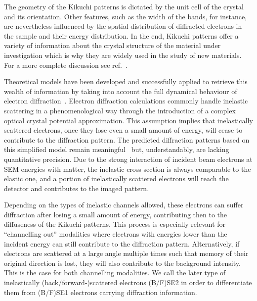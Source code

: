 The geometry of the Kikuchi patterns is dictated by the unit cell of the crystal and its orientation. Other features, such as the width of the bands, for instance, are nevertheless influenced by the spatial distribution of diffracted electrons in the sample and their energy distribution. In the end, Kikuchi patterns offer a variety of information about the crystal structure of the material under investigation which is why they are widely used in the study of new materials. For a more complete discussion see ref.~\cite{winkelmann2017}.


Theoretical models have been developed and successfully applied to retrieve this wealth of information by taking into account the full dynamical behaviour of electron diffraction~\cite{Winkelmann07, Picard14, singh2016}. Electron diffraction calculations commonly handle inelastic scattering in a phenomenological way through the introduction of a complex optical crystal potential approximation. This assumption implies that inelastically scattered electrons, once they lose even a small amount of energy, will cease to contribute to the diffraction pattern. The predicted diffraction patterns based on this simplified model remain meaningful~\cite{howie1963} but, understandably, are lacking quantitative precision. Due to the strong interaction of incident beam electrons at SEM energies with matter, the inelastic cross section is always comparable to the elastic one, and a portion of inelastically scattered electrons will reach the detector and contributes to the imaged pattern. 

Depending on the types of inelastic channels allowed, these electrons can suffer diffraction after losing a small amount of energy, contributing then to the diffuseness of the Kikuchi patterns. This process is especially relevant for ``channelling out'' modalities where electrons with energies lower than the incident energy can still contribute to the diffraction pattern. Alternatively, if electrons are scattered at a large angle multiple times such that memory of their original direction is lost, they will also contribute to the background intensity. This is the case for both channelling modalities. We call the later type of inelastically (back/forward-)scattered electrons (B/F)SE2 in order to differentiate them from (B/F)SE1 electrons carrying diffraction information.

